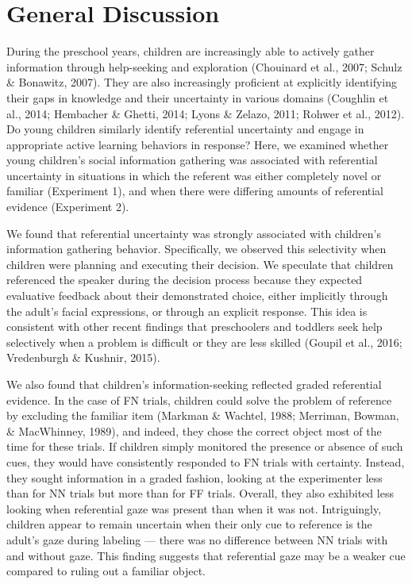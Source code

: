 \documentclass[english,,man]{apa6}
\begin{document}
\section{General Discussion}\label{general-discussion}

During the preschool years, children are increasingly able to actively
gather information through help-seeking and exploration (Chouinard et
al., 2007; Schulz \& Bonawitz, 2007). They are also increasingly
proficient at explicitly identifying their gaps in knowledge and their
uncertainty in various domains (Coughlin et al., 2014; Hembacher \&
Ghetti, 2014; Lyons \& Zelazo, 2011; Rohwer et al., 2012). Do young
children similarly identify referential uncertainty and engage in
appropriate active learning behaviors in response? Here, we examined
whether young children's social information gathering was associated
with referential uncertainty in situations in which the referent was
either completely novel or familiar (Experiment 1), and when there were
differing amounts of referential evidence (Experiment 2).

We found that referential uncertainty was strongly associated with
children's information gathering behavior. Specifically, we observed
this selectivity when children were planning and executing their
decision. We speculate that children referenced the speaker during the
decision process because they expected evaluative feedback about their
demonstrated choice, either implicitly through the adult's facial
expressions, or through an explicit response. This idea is consistent
with other recent findings that preschoolers and toddlers seek help
selectively when a problem is difficult or they are less skilled (Goupil
et al., 2016; Vredenburgh \& Kushnir, 2015).

We also found that children's information-seeking reflected graded
referential evidence. In the case of FN trials, children could solve the
problem of reference by excluding the familiar item (Markman \& Wachtel,
1988; Merriman, Bowman, \& MacWhinney, 1989), and indeed, they chose the
correct object most of the time for these trials. If children simply
monitored the presence or absence of such cues, they would have
consistently responded to FN trials with certainty. Instead, they sought
information in a graded fashion, looking at the experimenter less than
for NN trials but more than for FF trials. Overall, they also exhibited
less looking when referential gaze was present than when it was not.
Intriguingly, children appear to remain uncertain when their only cue to
reference is the adult's gaze during labeling --- there was no
difference between NN trials with and without gaze. This finding
suggests that referential gaze may be a weaker cue compared to ruling
out a familiar object.
\end{document}
